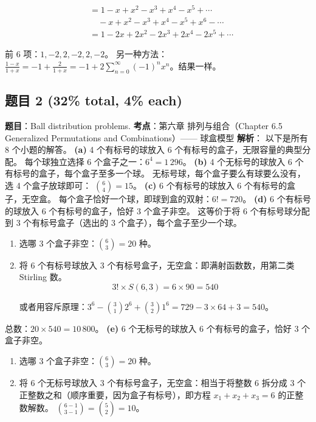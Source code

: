 \documentclass[10pt,a4paper,openany]{ctexbook}
\theoremstyle{definition}
\theoremstyle{remark}
\begin{document}
\[
\begin{aligned}
&= 1 - x + x^2 - x^3 + x^4 - x^5 + \cdots \\
&\quad - x + x^2 - x^3 + x^4 - x^5 + x^6 - \cdots \\
&= 1 - 2x + 2x^2 - 2x^3 + 2x^4 - 2x^5 + \cdots
\end{aligned}
\]

前 6 项：\textbf{$1, -2, 2, -2, 2, -2$}。
另一种方法：$\frac{1-x}{1+x} = -1 + \frac{2}{1+x} = -1 + 2\sum_{n=0}^{\infty} (-1)^n x^n$。结果一样。
\vspace{-2pt}

\subsection{题目 2 (32\% total, 4\% each)}

\textbf{题目}：Ball distribution problems.
\textbf{考点}：第六章 排列与组合（Chapter 6.5 Generalized Permutations and Combinations）—— 球盒模型
\textbf{解析}：
以下是所有 8 个小题的解答。
\textbf{(a)} 4 个有标号的球放入 6 个有标号的盒子，无限容量的典型分配。
每个球独立选择 6 个盒子之一：$6^4 = 1\,296$。
\textbf{(b)} 4 个无标号的球放入 6 个有标号的盒子，每个盒子至多一个球。
无标号球，每个盒子要么有球要么没有，选 4 个盒子放球即可：
$\binom{6}{4} = 15$。
\textbf{(c)} 6 个有标号的球放入 6 个有标号的盒子，无空盒。
每个盒子恰好一个球，即球到盒的双射：$6! = 720$。
\textbf{(d)} 6 个有标号的球放入 6 个有标号的盒子，恰好 3 个盒子非空。
这等价于将 6 个有标号球分配到 3 个有标号盒子（选出的 3 个盒子），每个盒子至少一个球。
\begin{enumerate}
\item 选哪 3 个盒子非空：$\binom{6}{3} = 20$ 种。
\item 将 6 个有标号球放入 3 个有标号盒子，无空盒：即满射函数数，用第二类 Stirling 数。
\[
   3! \times S(6,3) = 6 \times 90 = 540
\]

或者用容斥原理：$3^6 - \binom{3}{1}2^6 + \binom{3}{2}1^6 = 729 - 3 \times 64 + 3 = 540$。


\end{enumerate}

总数：$20 \times 540 = 10\,800$。
\textbf{(e)} 6 个无标号的球放入 6 个有标号的盒子，恰好 3 个盒子非空。
\begin{enumerate}
\item 选哪 3 个盒子非空：$\binom{6}{3} = 20$ 种。
\item 将 6 个无标号球放入 3 个有标号盒子，无空盒：相当于将整数 6 拆分成 3 个正整数之和（顺序重要，因为盒子有标号），即方程 $x_1 + x_2 + x_3 = 6$ 的正整数解数。
$\binom{6-1}{3-1} = \binom{5}{2} = 10$。


\end{enumerate}
\end{document}
